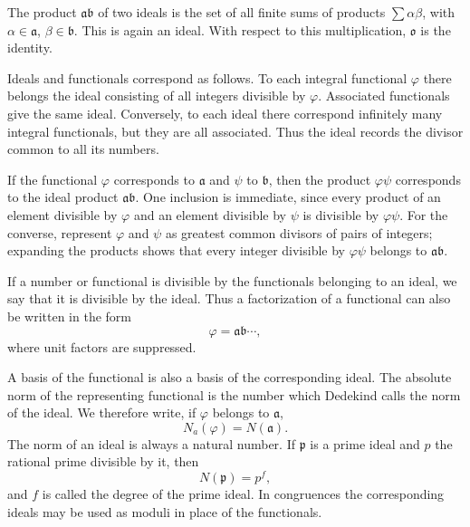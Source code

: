 \documentclass[12pt,a4paper]{article}
\begin{document}
The product \(\mathfrak a\mathfrak b\) of two ideals is the set of all finite sums of products \(\sum \alpha\beta\), with \(\alpha\in\mathfrak a\), \(\beta\in\mathfrak b\).  This is again an ideal.  With respect to this multiplication, \(\mathfrak o\) is the identity.

Ideals and functionals correspond as follows.  To each integral functional \(\varphi\) there belongs the ideal consisting of all integers divisible by \(\varphi\).  Associated functionals give the same ideal.  Conversely, to each ideal there correspond infinitely many integral functionals, but they are all associated.  Thus the ideal records the divisor common to all its numbers.

If the functional \(\varphi\) corresponds to \(\mathfrak a\) and \(\psi\) to \(\mathfrak b\), then the product \(\varphi\psi\) corresponds to the ideal product \(\mathfrak a\mathfrak b\).  One inclusion is immediate, since every product of an element divisible by \(\varphi\) and an element divisible by \(\psi\) is divisible by \(\varphi\psi\).  For the converse, represent \(\varphi\) and \(\psi\) as greatest common divisors of pairs of integers; expanding the products shows that every integer divisible by \(\varphi\psi\) belongs to \(\mathfrak a\mathfrak b\).

If a number or functional is divisible by the functionals belonging to an ideal, we say that it is divisible by the ideal.  Thus a factorization of a functional can also be written in the form
\begin{equation}
 \varphi=\mathfrak a\mathfrak b\cdots, \tag{1}
\end{equation}
where unit factors are suppressed.

A basis of the functional is also a basis of the corresponding ideal.  The absolute norm of the representing functional is the number which Dedekind calls the norm of the ideal.  We therefore write, if \(\varphi\) belongs to \(\mathfrak a\),
\begin{equation}
 N_a(\varphi)=N(\mathfrak a). \tag{2}
\end{equation}
The norm of an ideal is always a natural number.  If \(\mathfrak p\) is a prime ideal and \(p\) the rational prime divisible by it, then
\begin{equation}
 N(\mathfrak p)=p^f, \tag{3}
\end{equation}
and \(f\) is called the degree of the prime ideal.  In congruences the corresponding ideals may be used as moduli in place of the functionals.
\end{document}
